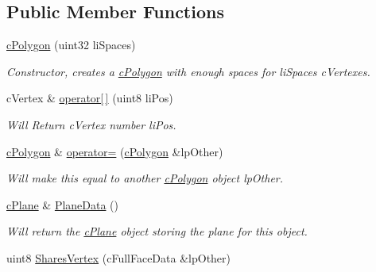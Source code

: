 \subsection*{Public Member Functions}
\begin{DoxyCompactItemize}
\item 
\hypertarget{classc_polygon_a4aba6e9981515eb94ff17111552b44f5}{
\hyperlink{classc_polygon_a4aba6e9981515eb94ff17111552b44f5}{cPolygon} (uint32 liSpaces)}
\label{classc_polygon_a4aba6e9981515eb94ff17111552b44f5}

\begin{DoxyCompactList}\small\item\em Constructor, creates a \hyperlink{classc_polygon}{cPolygon} with enough spaces for liSpaces cVertexes. \end{DoxyCompactList}\item 
\hypertarget{classc_polygon_abb1c2085b5548268b38d6fd0877271fa}{
cVertex \& \hyperlink{classc_polygon_abb1c2085b5548268b38d6fd0877271fa}{operator\mbox{[}$\,$\mbox{]}} (uint8 liPos)}
\label{classc_polygon_abb1c2085b5548268b38d6fd0877271fa}

\begin{DoxyCompactList}\small\item\em Will Return cVertex number liPos. \end{DoxyCompactList}\item 
\hypertarget{classc_polygon_ae755f6b8cd08a8f25ab66a7cfc3f7ac7}{
\hyperlink{classc_polygon}{cPolygon} \& \hyperlink{classc_polygon_ae755f6b8cd08a8f25ab66a7cfc3f7ac7}{operator=} (\hyperlink{classc_polygon}{cPolygon} \&lpOther)}
\label{classc_polygon_ae755f6b8cd08a8f25ab66a7cfc3f7ac7}

\begin{DoxyCompactList}\small\item\em Will make this equal to another \hyperlink{classc_polygon}{cPolygon} object lpOther. \end{DoxyCompactList}\item 
\hypertarget{classc_polygon_ab20ab89cfd3259aa3b804811eb13d1e0}{
\hyperlink{classc_plane}{cPlane} \& \hyperlink{classc_polygon_ab20ab89cfd3259aa3b804811eb13d1e0}{PlaneData} ()}
\label{classc_polygon_ab20ab89cfd3259aa3b804811eb13d1e0}

\begin{DoxyCompactList}\small\item\em Will return the \hyperlink{classc_plane}{cPlane} object storing the plane for this object. \end{DoxyCompactList}\item 
\hypertarget{classc_polygon_a75b10057e205d8b86ad691f6ad816616}{
uint8 \hyperlink{classc_polygon_a75b10057e205d8b86ad691f6ad816616}{SharesVertex} (cFullFaceData \&lpOther)}
\label{classc_polygon_a75b10057e205d8b86ad691f6ad816616}


\end{DoxyCompactItemize}
